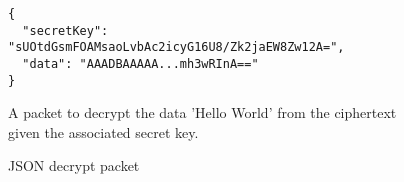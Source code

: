 \begin{figure}[H]
  \centering
  \begin{verbatim}
{
  "secretKey": "sUOtdGsmFOAMsaoLvbAc2icyG16U8/Zk2jaEW8Zw12A=",
  "data": "AAADBAAAAA...mh3wRInA=="
}
  \end{verbatim}
  \caption{
  	JSON decrypt packet
  }{
  	A packet to decrypt the data 'Hello World' from the ciphertext given the associated secret key.
  }
  \label{code:decrypt_data_json}
\end{figure}
